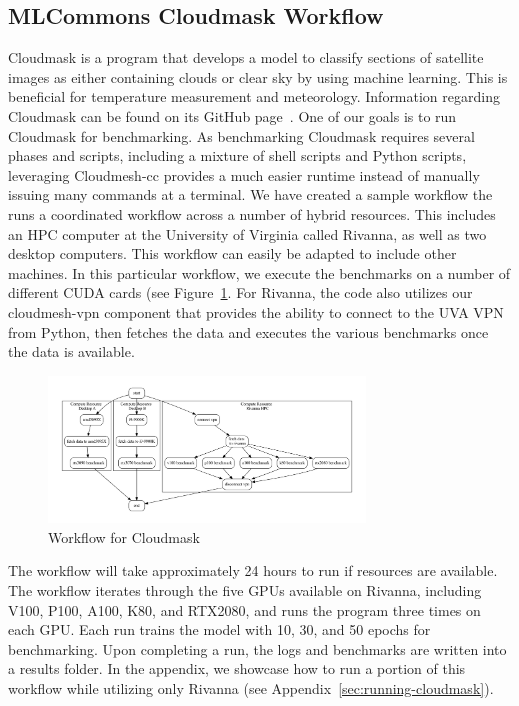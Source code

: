 \documentclass[sigplan,screen]{acmart}
\newcommand{\FILE}[1]{}
\begin{document}
% 

\FILE{Cloudmask.tex}

\subsection{MLCommons Cloudmask Workflow}
\label{cloudmask-workflow}

Cloudmask is a program that develops a model to classify sections of
satellite images as either containing clouds or clear sky by using
machine learning. This is beneficial for temperature measurement and
meteorology. Information regarding Cloudmask can be found on its
GitHub page~\cite{www-cloudmask}. One of our goals is to run
Cloudmask for benchmarking. As benchmarking Cloudmask requires
several phases and scripts, including a mixture of shell scripts and
Python scripts, leveraging Cloudmesh-cc provides a much easier runtime
instead of manually issuing many commands at a terminal. We have
created a sample workflow the runs a coordinated workflow across a
number of hybrid resources. This includes an HPC computer at the
University of Virginia called Rivanna, as well as two desktop
computers. This workflow can easily be adapted to include other
machines. In this particular workflow, we execute the benchmarks on a
number of different CUDA cards (see Figure~\ref{fig:cloudmaskwf}. For
Rivanna, the code also utilizes our cloudmesh-vpn component that
provides the ability to connect to the UVA VPN from Python, then
fetches the data and executes the various benchmarks once the data is
available.

\begin{figure}[htb]
\centering
\includegraphics[width=0.75\textwidth]{./images/cloudmask-wf.pdf}
\caption{Workflow for Cloudmask}\label{fig:cloudmaskwf}
\end{figure}

The workflow will take approximately 24 hours to run if resources are
available. The workflow iterates through the five GPUs available on
Rivanna, including V100, P100, A100, K80, and RTX2080, and runs the
program three times on each GPU. Each run trains the model with 10,
30, and 50 epochs for benchmarking. Upon completing a run, the logs
and benchmarks are written into a results folder. In the appendix, we
showcase how to run a portion of this workflow while utilizing
only Rivanna (see Appendix~\ref{sec:running-cloudmask}).
\end{document}
